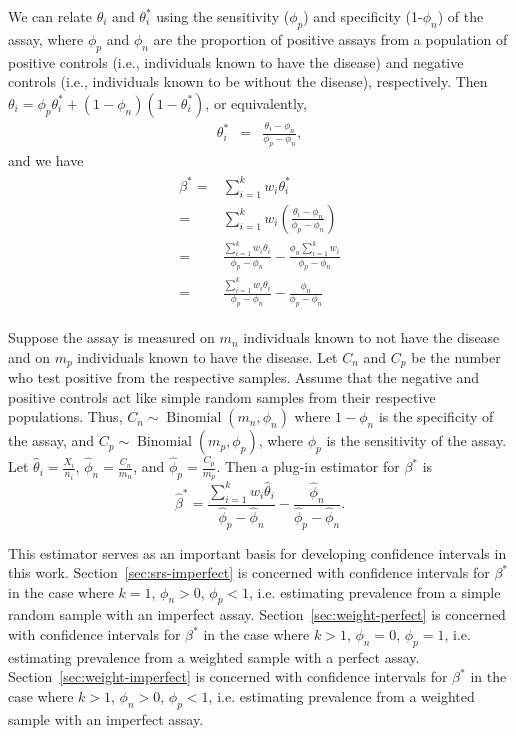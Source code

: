 \documentclass[AMA,STIX1COL]{WileyNJD-v2}
\begin{document}
We can relate $\theta_i$ and $\theta_i^*$ using the sensitivity ($\phi_p$)  and specificity (1-$\phi_n$) of the assay, 
where  $\phi_p$ and $\phi_n$  are the proportion of positive assays from a population of  positive controls (i.e., individuals known to have the disease) and 
negative controls (i.e., individuals known to be  without the disease), respectively. Then
$\theta_i = \phi_p \theta_i^* + (1-\phi_n) (1-\theta_i^*)$, or equivalently,  
\begin{eqnarray*}
\theta_i^* & = & \frac{ \theta_i - \phi_n }{\phi_p - \phi_n},
\end{eqnarray*}
and we have
\begin{align}
\begin{split}
  \beta^*   =&   \sum_{i=1}^k w_i \theta_i^* \\
            =&  \sum_{i=1}^k w_i \left( \frac{\theta_i - \phi_n}{\phi_p - \phi_n} \right) \\
            =&   \frac{\sum_{i=1}^k w_i \theta_i}{\phi_p - \phi_n} - \frac{\phi_n \sum_{i=1}^k w_i}{\phi_p - \phi_n} \\
            =&   \frac{\sum_{i=1}^k w_i \theta_i}{\phi_p - \phi_n} - \frac{\phi_n}{\phi_p - \phi_n}
            \label{eq:long-beta}
\end{split}
\end{align}


Suppose the assay is measured on \( m_n \) individuals known to not have the disease and on \( m_p \) individuals known to have the disease.
Let \( C_n \) and \( C_p \) be the number who test positive from the respective samples.
Assume that the negative and positive controls act like simple random samples from their respective populations.
Thus, \( C_n \sim \operatorname{Binomial}(m_n, \phi_n) \) where \( 1 - \phi_n \) is the specificity of the assay, and \( C_p \sim \operatorname{Binomial}(m_p, \phi_p) \), where  \( \phi_p \) is the sensitivity of the assay.
Let \( \hat{\theta}_i = \frac{X_i}{n_i} \), \( \hat{\phi}_n = \frac{C_n}{m_n} \), and \( \hat{\phi}_p = \frac{C_p}{m_p} \).
Then a plug-in estimator for \( \beta^* \) is 
\begin{equation}
    \hat{\beta}^* = \frac{\sum_{i=1}^k w_i \hat{\theta}_i}{\hat{\phi}_p - \hat{\phi}_n} - \frac{\hat{\phi}_n}{\hat{\phi}_p - \hat{\phi}_n}. \label{eq:betastarhat}
\end{equation}

This estimator serves as an important basis for developing confidence intervals in this work.
Section~\ref{sec:srs-imperfect} is concerned with confidence intervals for  \( \beta^* \) in the case where \( k = 1 \), \( \phi_n > 0 \), \( \phi_p < 1 \), i.e. estimating prevalence from a simple random sample with an imperfect assay.
Section~\ref{sec:weight-perfect} is concerned with confidence intervals for  \( \beta^* \) in the case where \( k > 1 \), \( \phi_n = 0 \), \( \phi_p = 1 \), i.e. estimating prevalence from a weighted sample with a perfect assay.
Section~\ref{sec:weight-imperfect} is concerned with confidence intervals for  \( \beta^* \) in the case where \( k > 1 \), \( \phi_n > 0 \), \( \phi_p < 1 \), i.e. estimating prevalence from a weighted sample with an imperfect assay.
\end{document}
